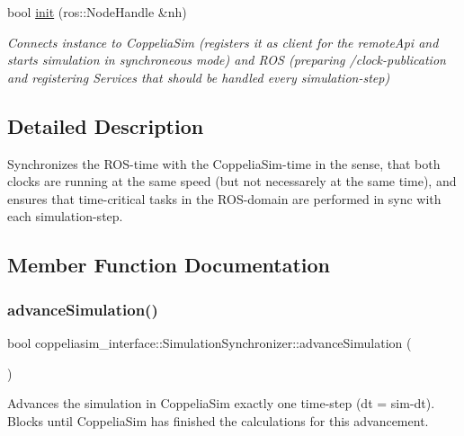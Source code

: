 \begin{DoxyCompactItemize}
bool \hyperlink{classcoppeliasim__interface_1_1SimulationSynchronizer_a86f3212df7425b946c6148ab324fd2bc}{init} (ros\+::\+Node\+Handle \&nh)
\begin{DoxyCompactList}\small\item\em Connects instance to Coppelia\+Sim (registers it as client for the remote\+Api and starts simulation in synchroneous mode) and R\+OS (preparing /clock-\/publication and registering Services that should be handled every simulation-\/step) \end{DoxyCompactList}\end{DoxyCompactItemize}


\subsection{Detailed Description}
Synchronizes the R\+O\+S-\/time with the Coppelia\+Sim-\/time in the sense, that both \textquotesingle{}clocks\textquotesingle{} are running at the same speed (but not necessarely at the same time), and ensures that time-\/critical tasks in the R\+O\+S-\/domain are performed in sync with each simulation-\/step. 

\subsection{Member Function Documentation}
\mbox{\label{classcoppeliasim__interface_1_1SimulationSynchronizer_a511f8bf3569c7dce3dafb2a6f30dd6f2}} 
\subsubsection{\texorpdfstring{advance\+Simulation()}{advanceSimulation()}}
{\footnotesize\ttfamily bool coppeliasim\+\_\+interface\+::\+Simulation\+Synchronizer\+::advance\+Simulation (\begin{DoxyParamCaption}{ }\end{DoxyParamCaption})}



Advances the simulation in Coppelia\+Sim exactly one time-\/step (dt = \textquotesingle{}sim-\/dt\textquotesingle{}). Blocks until Coppelia\+Sim has finished the calculations for this advancement. 


